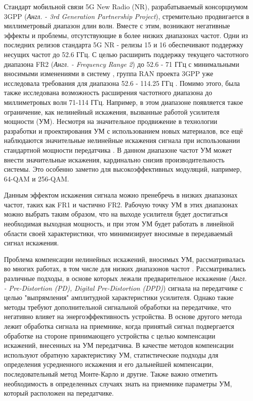 \documentclass{unn}
\begin{document}
\maketitle
\newpage
\Introduction

Стандарт мобильной связи 5G New Radio (NR), разрабатываемый консорциумом
3GPP (\textit{Англ. - 3rd Generation Partnership Project}), стремительно
продвигается в миллиметровый диапазон длин волн. Вместе с этим, возникают
негативные эффекты и проблемы, отсутствующие в более низких диапазонах частот.
Одни из последних релизов стандарта 5G NR - релизы 15 и 16 обеспечивают
поддержку несущих частот до 52.6 ГГц. С целью расширить поддержку текущего
частотного диапазона FR2 (\textit{Англ. - Frequency Range 2}) до 52.6 - 71 ГГц с
минимальными вносимыми изменениями в систему \cite{intel193259}
\cite{qlcm193229}, группа RAN проекта 3GPP уже исследовала требования для
диапазона 52.6 - 114.25 ГГц \cite{3gpp.38.807}. Помимо этого, была также
исследована возможность расширения частотного диапазона до миллиметровых
волн 71-114 ГГц. Например, в этом диапазоне появляется такое ограничение, как
нелинейный искажения, вызванные работой усилителя мощности (УМ). Несмотря
на значительное продвижение в технологии разработки и проектирования УМ с
использованием новых материалов, все ещё наблюдаются значительные нелинейные
искажения сигнала при использовании стандартной мощности передатчика
\cite{zhang2021}. В данном диапазоне частот УМ может внести значительные
искажения, кардинально снизив производительность
системы. Это особенно заметно для высокоэффективных модуляций, например,
64-QAM и 256-QAM.

Данным эффектом искажения сигнала можно пренебречь в низких диапазонах
частот, таких как FR1 и частично FR2. Рабочую точку УМ в этих диапазонах
можно выбрать таким образом, что на выходе усилителя будет достигаться
необходимая выходная мощность, и при этом УМ будет работать в линейной
области своей характеристики, что минимизирует вносимые в передаваемый
сигнал искажения.


Проблема компенсации нелинейных искажений, вносимых УМ, рассматривалась во
многих работах, в том числе для низких диапазонов частот
\cite[]{sharath2015,shabany2008,eda2001,maltsev2021,bhat2016,qi2010,gregorio2007}.
Рассматривались различные подходы, в основе которых лежали предварительное
искажение (\textit{Англ. - Pre-Distortion (PD), Digital Pre-Distortion
(DPD)}) сигнала на передатчике с целью "выпрямления" амплитудной
характеристики усилителя. Однако такие методы требуют дополнительной
сигнальной обработки на передатчике, что негативно влияет на
энергоэффективность устройства. В основе другого метода лежит обработка
сигнала на приемнике, когда принятый сигнал подвергается обработке на
стороне принимающего устройства с целью компенсации искажений, внесенных на
УМ передатчика. В качестве методов компенсации используют обратную
характеристику УМ, статистические подходы для определения усредненного
искажения и его дальнейшей компенсации, последовательный метод Монте-Карло
и другие. Также важно отметить необходимость в определенных случаях знать
на приемнике параметры УМ, который расположен на передатчике.
\end{document}
